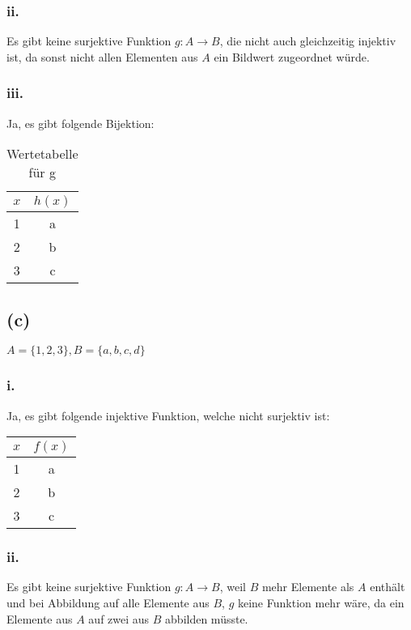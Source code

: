 \documentclass[11pt,a4paper]{article}
\begin{document}
\subsubsection{ii.}
Es gibt keine surjektive Funktion $g : A \rightarrow B$, die nicht auch gleichzeitig injektiv ist, da sonst nicht allen Elementen aus $A$ ein Bildwert zugeordnet würde.

\newpage
\subsubsection{iii.}
Ja, es gibt folgende Bijektion:

\begin{table}[!th]
\begin{tabular}{|c|c|}
\hline
$x$ & $h(x)$\\
\hline
1 & a \\
2 & b \\
3 & c \\
\hline
\end{tabular}
\caption{Wertetabelle für g}
\label{ex:table}
\end{table}


\subsection{(c)}
$A = \{1,2,3\}, B = \{a,b,c,d\}$

\subsubsection{i.}
Ja, es gibt folgende injektive Funktion, welche nicht surjektiv ist:

\begin{table}[!th]
\begin{tabular}{|c|c|}
\hline
$x$ & $f(x)$\\
\hline
1 & a \\
2 & b \\
3 & c \\
\hline
\end{tabular}
\end{table}

\subsubsection{ii.}
Es gibt keine surjektive Funktion $g : A \rightarrow B$, weil $B$ mehr Elemente als $A$ enthält und bei Abbildung auf alle Elemente aus $B$, $g$ keine Funktion mehr wäre, da ein Elemente aus $A$ auf zwei aus $B$ abbilden müsste.
\end{document}
